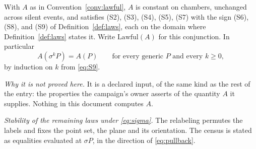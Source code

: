 \begin{axiom}\label{ax:lawful}
With $A$ as in Convention~\ref{conv:lawful}, $A$ is constant on chambers,
unchanged across silent events, and satisfies (S2), (S3), (S4), (S5), (S7) with
the sign (S6), (S8), and (S9) of Definition~\ref{def:laws}, each on the domain
where Definition~\ref{def:laws} states it. Write $\mathrm{Lawful}(A)$ for this
conjunction. In particular
\begin{equation}
  A(\sigma^{k}P)=A(P)\qquad\text{for every generic }P\text{ and every }k\geq0,
  \label{eq:lawful-cyclic}
\end{equation}
by induction on $k$ from \eqref{eq:S9}.

\emph{Why it is not proved here.} It is a declared input, of the same kind as
the rest of the entry: the properties the campaign's owner asserts of the
quantity $A$ it supplies. Nothing in this document computes $A$.

\emph{Stability of the remaining laws under \eqref{eq:sigma}.} The relabeling
permutes the labels and fixes the point set, the plane and its orientation. The
census is stated as equalities evaluated at $\sigma P$, in the direction of
\eqref{eq:pullback}.


\end{axiom}
